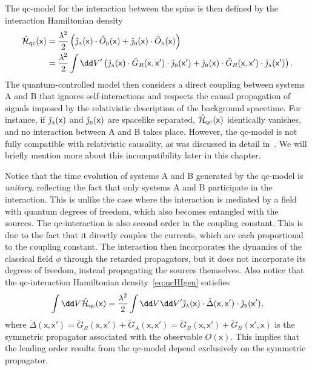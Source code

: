 \documentclass[letterpaper,12pt,titlepage,oneside,final]{book}
\newcommand{\mf}{\mathsf}%
\newcommand{\tc}[1]{\textsc{#1}}
\begin{document}
The qc-model for the interaction between the spins is then defined by the interaction Hamiltonian density
\begin{align}
    \hat{\mathcal{H}}_{\text{qc}}(\mf x) &= \frac{\lambda^2}{2} \left(\hat{\jmath}_\tc{a}(\mf x)\cdot \hat{O}_\tc{b}(\mf x) + \hat{\jmath}_\tc{b}(\mf x)\cdot \hat{O}_\tc{a}(\mf x) \right)\\
    &= \frac{\lambda^2}{2} \int \dd V' \left(\hat{\jmath}_\tc{a}(\mf x)\cdot \tilde{G}_R(\mf x, \mf x')\cdot \hat{\jmath}_\tc{b}(\mf x') + \hat{\jmath}_\tc{b}(\mf x)\cdot \tilde{G}_R(\mf x, \mf x')\cdot \hat{\jmath}_\tc{a}(\mf x') \right).\label{eq:qcHIgen}
\end{align}
The quantum-controlled model then considers a direct coupling between systems A and B that ignores self-interactions and respects the causal propagation of signals imposed by the relativistic description of the background spacetime. For instance, if $\hat{\jmath}_\tc{a}(\mf x)$ and $\hat{\jmath}_\tc{b}(\mf x)$ are spacelike separated, $\hat{\mathcal{H}}_\tc{qc}(\mf x)$ identically vanishes, and no interaction between A and B takes place. However, the qc-model is not fully compatible with relativistic causality, as was discussed in detail in~\cite{eirini}. We will briefly mention more about this incompatibility later in this chapter. 



Notice that the time evolution of systems A and B generated by the qc-model is \textit{unitary}, reflecting the fact that only systems A and B participate in the interaction. This is unlike the case where the interaction is mediated by a field with quantum degrees of freedom, which also becomes entangled with the sources. The qc-interaction is also second order in the coupling constant. This is due to the fact that it directly couples the currents, which are each proportional to the coupling constant. The interaction then incorporates the dynamics of the classical field $\phi$ through the retarded propagators, but it does not incorporate its degrees of freedom, instead propagating the sources themselves. Also notice that the qc-interaction Hamiltonian density~\eqref{eq:qcHIgen} satisfies
\begin{equation}
    \int \dd V \hat{\mathcal{H}}_\text{qc}(\mf x) = \frac{\lambda^2}{2}\int \dd V \dd V' \hat{\jmath}_\tc{a}(\mf x)\cdot \tilde{\Delta}(\mf x, \mf x')\cdot \hat{\jmath}_\tc{b}(\mf x'), 
\end{equation}
where $\tilde{\Delta}(\mf x, \mf x') = \tilde{G}_R(\mf x, \mf x') + \tilde{G}_A(\mf x, \mf x') = \tilde{G}_R(\mf x, \mf x') + \tilde{G}_R(\mf x', \mf x)$ is the symmetric propagator associated with the observable $O(\mf x)$. This implies that the leading order results from the qc-model depend exclusively on the symmetric propagator. 
\end{document}

